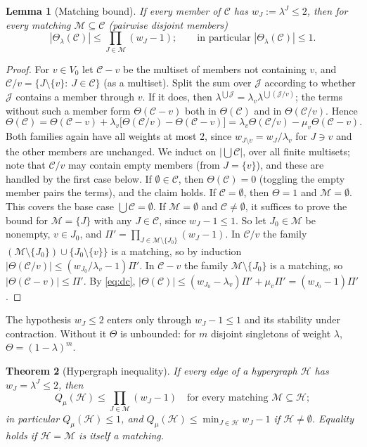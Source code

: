 \documentclass[11pt,reqno]{amsart}
\newtheorem{theorem}{Theorem}[section]
\newtheorem{lemma}[theorem]{Lemma}
\theoremstyle{definition}
\newcommand{\Ho}{\mathcal H}
\newcommand{\cJ}{\mathcal J}
\newcommand{\cM}{\mathcal M}
\newcommand{\cC}{\mathcal C}
\begin{document}
\begin{lemma}[Matching bound]\label{lem:theta}
If every member of $\cC$ has $w_J:=\lambda^J\le2$, then for every matching
$\cM\subseteq\cC$ \textup{(}pairwise disjoint members\textup{)}
\[
 |\Theta_\lambda(\cC)|\le\prod_{J\in\cM}(w_J-1);\qquad\text{in particular }|\Theta_\lambda(\cC)|\le1 .
\]
\end{lemma}

\begin{proof}
For $v\in V_0$ let $\cC-v$ be the multiset of members not containing $v$, and
$\cC/v=\{J\setminus\{v\}:\ J\in\cC\}$ (as a multiset).  Split the sum over $\cJ$
according to whether $\cJ$ contains a member through $v$.  If it does, then
$\lambda^{\bigcup\cJ}=\lambda_v\lambda^{\bigcup(\cJ/v)}$; the terms without such a member form
$\Theta(\cC-v)$ both in $\Theta(\cC)$ and in $\Theta(\cC/v)$.  Hence
\begin{equation}\label{eq:dc}
 \Theta(\cC)=\Theta(\cC-v)+\lambda_v\big[\Theta(\cC/v)-\Theta(\cC-v)\big]=\lambda_v\Theta(\cC/v)-\mu_v\Theta(\cC-v).
\end{equation}
Both families again have all weights at most $2$, since $w_{J\setminus v}=w_J/\lambda_v$ for
$J\ni v$ and the other members are unchanged.
We induct on $|\bigcup\cC|$, over all finite multisets; note that $\cC/v$ may
contain empty members (from $J=\{v\}$), and these are handled by the first
case below.  If $\emptyset\in\cC$, then $\Theta(\cC)=0$ (toggling the
empty member pairs the terms), and the claim holds.  If $\cC=\emptyset$, then
$\Theta=1$ and $\cM=\emptyset$.  This covers the base case $\bigcup\cC=\emptyset$.  If
$\cM=\emptyset$ and $\cC\ne\emptyset$, it suffices to prove the bound for $\cM=\{J\}$ with
any $J\in\cC$, since $w_J-1\le1$.  So let $J_0\in\cM$ be nonempty, $v\in J_0$, and
$\Pi'=\prod_{J\in\cM\setminus\{J_0\}}(w_J-1)$.  In $\cC/v$ the family
$(\cM\setminus\{J_0\})\cup\{J_0\setminus\{v\}\}$ is a matching, so by induction
$|\Theta(\cC/v)|\le(w_{J_0}/\lambda_v-1)\Pi'$.  In $\cC-v$ the family $\cM\setminus\{J_0\}$ is a
matching, so $|\Theta(\cC-v)|\le\Pi'$.  By \eqref{eq:dc},
$|\Theta(\cC)|\le(w_{J_0}-\lambda_v)\Pi'+\mu_v\Pi'=(w_{J_0}-1)\Pi'$.
\end{proof}

The hypothesis $w_J\le2$ enters only through $w_J-1\le1$ and its stability
under contraction.  Without it $\Theta$ is unbounded: for $m$ disjoint
singletons of weight $\lambda$, $\Theta=(1-\lambda)^m$.

\begin{theorem}[Hypergraph inequality]\label{thm:Q}
If every edge of a hypergraph $\Ho$ has $w_J=\lambda^J\le2$, then
\[
 Q_\mu(\Ho)\le\prod_{J\in\cM}(w_J-1)\quad\text{for every matching }\cM\subseteq\Ho;
\]
in particular $Q_\mu(\Ho)\le1$, and $Q_\mu(\Ho)\le\min_{J\in\Ho}w_J-1$ if $\Ho\ne\emptyset$.
Equality holds if $\Ho=\cM$ is itself a matching.
\end{theorem}
\end{document}

